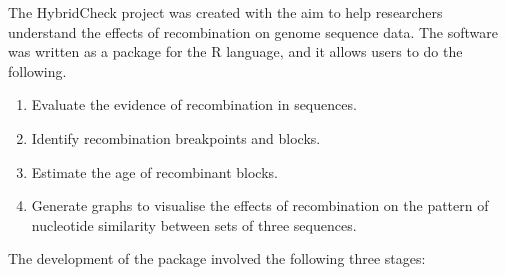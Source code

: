The HybridCheck project was created with the aim to help researchers understand the effects of recombination on genome sequence data. The software was written as a package for the R language, and it allows users to do the following. 

\begin{enumerate}
	\item Evaluate the evidence of recombination in sequences.
    \item Identify recombination breakpoints and blocks.
    \item Estimate the age of recombinant blocks.
    \item Generate graphs to visualise the effects of recombination on the pattern of nucleotide similarity between sets of three sequences.
\end{enumerate}

The development of the package involved the following three stages:

